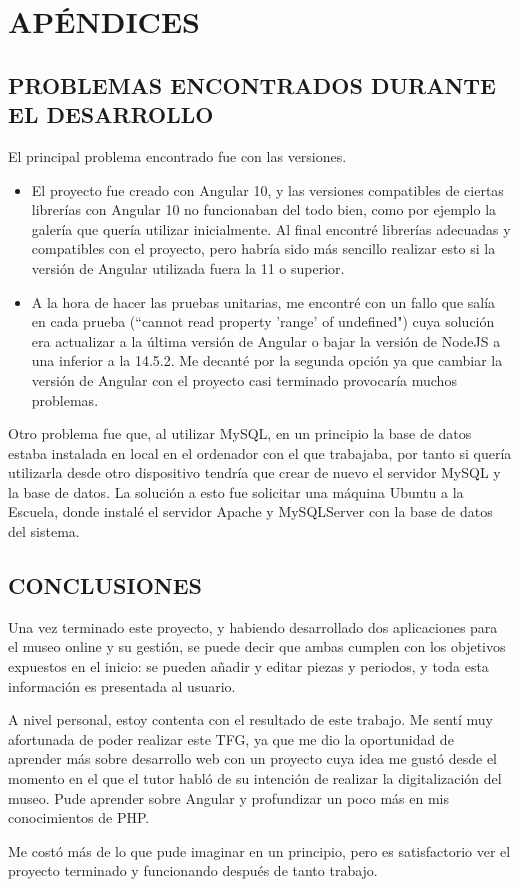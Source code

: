 \newpage
\chapter{APÉNDICES}
\newpage

\section{PROBLEMAS ENCONTRADOS DURANTE EL DESARROLLO}
El principal problema encontrado fue con las versiones. 
\begin{itemize}
\item El proyecto fue creado con Angular 10, y las versiones compatibles de ciertas librerías con Angular 10 no funcionaban del todo bien, como por ejemplo la galería que quería utilizar inicialmente. Al final encontré librerías adecuadas y compatibles con el proyecto, pero habría sido más sencillo realizar esto si la versión de Angular utilizada fuera la 11 o superior.
\item A la hora de hacer las pruebas unitarias, me encontré con un fallo que salía en cada prueba (``cannot read property 'range' of undefined") cuya solución era actualizar a la última versión de Angular o bajar la versión de NodeJS a una inferior a la 14.5.2. Me decanté por la segunda opción ya que cambiar la versión de Angular con el proyecto casi terminado provocaría muchos problemas.
\end{itemize}
\par Otro problema fue que, al utilizar MySQL, en un principio la base de datos estaba instalada en local en el ordenador con el que trabajaba, por tanto si quería utilizarla desde otro dispositivo tendría que crear de nuevo el servidor MySQL y la base de datos. La solución a esto fue solicitar una máquina Ubuntu a la Escuela, donde instalé el servidor Apache y MySQLServer con la base de datos del sistema.

\newpage
\section{CONCLUSIONES}
Una vez terminado este proyecto, y habiendo desarrollado dos aplicaciones para el museo online y su gestión, se puede decir que ambas cumplen con los objetivos expuestos en el inicio: se pueden añadir y editar piezas y periodos, y toda esta información es presentada al usuario.\par
A nivel personal, estoy contenta con el resultado de este trabajo. Me sentí muy afortunada de poder realizar este TFG, ya que me dio la oportunidad de aprender más sobre desarrollo web con un proyecto cuya idea me gustó desde el momento en el que el tutor habló de su intención de realizar la digitalización del museo. Pude aprender sobre Angular y profundizar un poco más en mis conocimientos de PHP. \par
Me costó más de lo que pude imaginar en un principio, pero es satisfactorio ver el proyecto terminado y funcionando después de tanto trabajo.


